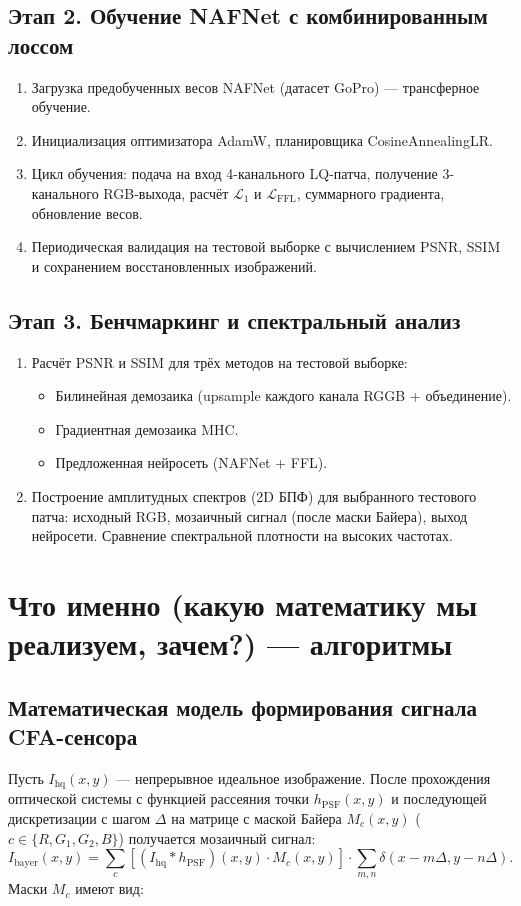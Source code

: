 \documentclass[12pt,a4paper]{article}
\begin{document}
\subsection{Этап 2. Обучение NAFNet с комбинированным лоссом}
\begin{enumerate}
    \item Загрузка предобученных весов NAFNet (датасет GoPro) — трансферное обучение.
    \item Инициализация оптимизатора AdamW, планировщика CosineAnnealingLR.
    \item Цикл обучения: подача на вход 4-канального LQ-патча, получение 3-канального RGB-выхода, расчёт $\mathcal{L}_1$ и $\mathcal{L}_{\text{FFL}}$, суммарного градиента, обновление весов.
    \item Периодическая валидация на тестовой выборке с вычислением PSNR, SSIM и сохранением восстановленных изображений.
\end{enumerate}

\subsection{Этап 3. Бенчмаркинг и спектральный анализ}
\begin{enumerate}
    \item Расчёт PSNR и SSIM для трёх методов на тестовой выборке:
    \begin{itemize}
        \item Билинейная демозаика (upsample каждого канала RGGB + объединение).
        \item Градиентная демозаика MHC.
        \item Предложенная нейросеть (NAFNet + FFL).
    \end{itemize}
    \item Построение амплитудных спектров (2D БПФ) для выбранного тестового патча: исходный RGB, мозаичный сигнал (после маски Байера), выход нейросети. Сравнение спектральной плотности на высоких частотах.
\end{enumerate}

\section{Что именно (какую математику мы реализуем, зачем?) — алгоритмы}

\subsection{Математическая модель формирования сигнала CFA-сенсора}
Пусть $I_{\text{hq}}(x,y)$ — непрерывное идеальное изображение. После прохождения оптической системы с функцией рассеяния точки $h_{\text{PSF}}(x,y)$ и последующей дискретизации с шагом $\Delta$ на матрице с маской Байера $M_c(x,y)$ ($c \in \{R,G_1,G_2,B\}$) получается мозаичный сигнал:
\[
I_{\text{bayer}}(x,y) = \sum_c \left[ (I_{\text{hq}} * h_{\text{PSF}})(x,y) \cdot M_c(x,y) \right] \cdot \sum_{m,n} \delta(x-m\Delta, y-n\Delta).
\]
Маски $M_c$ имеют вид:
\end{document}
